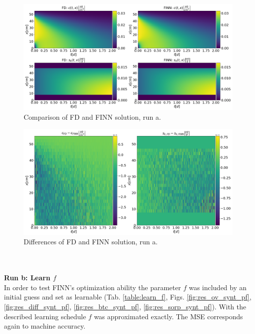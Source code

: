 \begin{figure}[]
	\centering
	\includegraphics[width=\textwidth]{images/res_ov_synt_dummy.png}
\caption[Comparison of FD and FINN solution, run a]{Comparison of FD and FINN solution, run a.}
\label{fig:res_ov_synt_dummy}
\end{figure}
\begin{figure}[]
	\centering
	\includegraphics[width=\textwidth]{images/res_diff_synt_dummy.png}
\caption[Difference of FD and FINN solution, run a]{Differences of FD and FINN solution, run a.}
\label{fig:res_diff_synt_dummy}
\end{figure}
\FloatBarrier
\\
\\
\textbf{Run b: Learn $f$}
\\
In order to test FINN's optimization ability the parameter $f$ was included by an initial guess and set as learnable (Tab. \ref{table:learn_f}, Figs. \ref{fig:res_ov_synt_pf}, \ref{fig:res_diff_synt_pf}, \ref{fig:res_btc_synt_pf}, \ref{fig:res_sorp_synt_pf}). With the described learning schedule $f$ was approximated exactly. The MSE corresponds again to machine accuracy.
